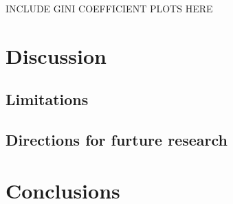 \documentclass[preprint, 3p,
authoryear]{elsarticle} %
\begin{document}
INCLUDE GINI COEFFICIENT PLOTS HERE

\section{Discussion}\label{discussion}

\subsection{Limitations}\label{limitations}

\subsection{Directions for furture
research}\label{directions-for-furture-research}

\section{Conclusions}\label{conclusions}

\renewcommand\refname{References}

\end{document}
